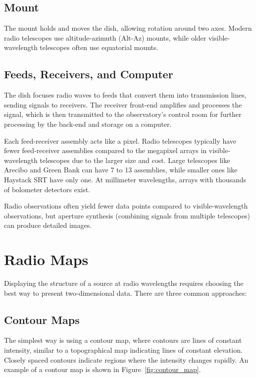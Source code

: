 \subsection{Mount}
The mount holds and moves the dish, allowing rotation around two axes. Modern radio telescopes use altitude-azimuth (Alt-Az) mounts, while older visible-wavelength telescopes often use equatorial mounts.

\subsection{Feeds, Receivers, and Computer}
The dish focuses radio waves to feeds that convert them into transmission lines, sending signals to receivers. The receiver front-end amplifies and processes the signal, which is then transmitted to the observatory's control room for further processing by the back-end and storage on a computer.

Each feed-receiver assembly acts like a pixel. Radio telescopes typically have fewer feed-receiver assemblies compared to the megapixel arrays in visible-wavelength telescopes due to the larger size and cost. Large telescopes like Arecibo and Green Bank can have 7 to 13 assemblies, while smaller ones like Haystack SRT have only one. At millimeter wavelengths, arrays with thousands of bolometer detectors exist.

Radio observations often yield fewer data points compared to visible-wavelength observations, but aperture synthesis (combining signals from multiple telescopes) can produce detailed images.

\clearpage

\section{Radio Maps}

Displaying the structure of a source at radio wavelengths requires choosing the best way to present two-dimensional data. There are three common approaches:

\subsection{Contour Maps}

The simplest way is using a contour map, where contours are lines of constant intensity, similar to a topographical map indicating lines of constant elevation. Closely spaced contours indicate regions where the intensity changes rapidly. An example of a contour map is shown in Figure~\ref{fig:contour_map}.

